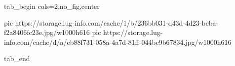  
 
 
 
 

\ifcmt
  tab_begin cols=2,no_fig,center

     pic https://storage.lug-info.com/cache/1/b/236bb031-d43d-4d23-bcba-f2a8406fc23e.jpg/w1000h616
		 pic https://storage.lug-info.com/cache/d/a/eb88f731-058a-4a7d-81ff-044bc9b67834.jpg/w1000h616

  tab_end
\fi
